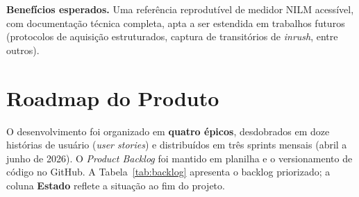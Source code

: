 \documentclass[12pt,a4paper]{article}
\begin{document}
\textbf{Benef\'icios esperados.} Uma refer\^encia reprodut\'ivel de medidor NILM
acess\'ivel, com documenta\c{c}\~ao t\'ecnica completa, apta a ser estendida em
trabalhos futuros (protocolos de aquisi\c{c}\~ao estruturados, captura de
transit\'orios de \textit{inrush}, entre outros).

\section{Roadmap do Produto}

O desenvolvimento foi organizado em \textbf{quatro \'epicos}, desdobrados em doze
hist\'orias de usu\'ario (\textit{user stories}) e distribu\'idos em tr\^es sprints
mensais (abril a junho de 2026). O \textit{Product Backlog} foi mantido em planilha
e o versionamento de c\'odigo no GitHub. A
Tabela~\ref{tab:backlog} apresenta o backlog priorizado; a coluna \textbf{Estado}
reflete a situa\c{c}\~ao ao fim do projeto.
\end{document}
